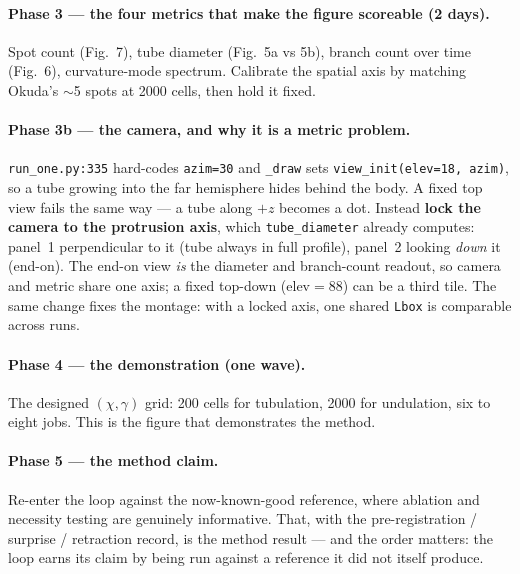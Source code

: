 \documentclass[11pt]{article}
\newcommand{\code}[1]{\texttt{#1}}
\begin{document}
{\paragraph{Phase 3 --- the four metrics that make the figure scoreable (2 days).}
Spot count (Fig.~7), tube diameter (Fig.~5a vs 5b), branch count over time (Fig.~6),
curvature-mode spectrum. Calibrate the spatial axis by matching Okuda's $\sim$5 spots at 2000
cells, then hold it fixed.

\paragraph{Phase 3b --- the camera, and why it is a metric problem.}
\code{run\_one.py:335} hard-codes \code{azim=30} and \code{\_draw} sets
\code{view\_init(elev=18,\,azim)}, so a tube growing into the far hemisphere hides behind the
body. A fixed top view fails the same way --- a tube along $+z$ becomes a dot. Instead
\textbf{lock the camera to the protrusion axis}, which \code{tube\_diameter} already computes:
panel~1 perpendicular to it (tube always in full profile), panel~2 looking \emph{down} it (end-on).
The end-on view \emph{is} the diameter and branch-count readout, so camera and metric share one
axis; a fixed top-down ($\text{elev}=88$) can be a third tile. The same change fixes the montage:
with a locked axis, one shared \code{Lbox} is comparable across runs.

\paragraph{Phase 4 --- the demonstration (one wave).}
The designed $(\chi,\gamma)$ grid: 200 cells for tubulation, 2000 for undulation, six to eight
jobs. This is the figure that demonstrates the method.

\paragraph{Phase 5 --- the method claim.}
Re-enter the loop against the now-known-good reference, where ablation and necessity testing are
genuinely informative. That, with the pre-registration / surprise / retraction record, is the method
result --- and the order matters: the loop earns its claim by being run against a reference it did
not itself produce.
}
\end{document}
